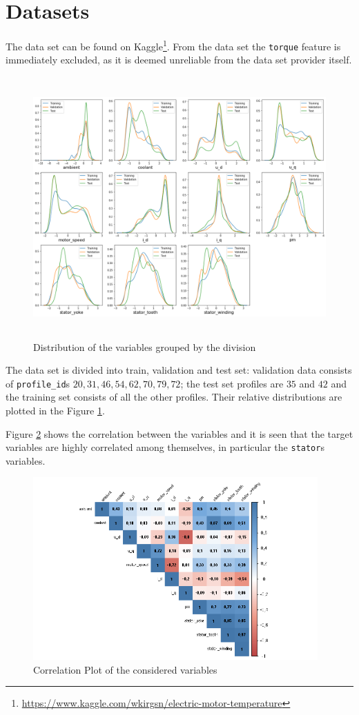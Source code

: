 \section{Datasets}
The data set can be found on Kaggle\footnote{\href{https://www.kaggle.com/wkirgsn/electric-motor-temperature}{https://www.kaggle.com/wkirgsn/electric-motor-temperature}}. From the data set the \verb|torque| feature is immediately excluded, as it is deemed unreliable from the data set provider itself.
\begin{figure}[!h]
    \centering
    \includegraphics[width=\linewidth, height=10cm]{imgs/dist_plot.png}
    \caption{Distribution of the variables grouped by the division}
    \label{fig:dist_plot}
\end{figure}

The data set is divided into train, validation and test set: validation data consists of \verb|profile_id|s $20, 31, 46, 54, 62, 70, 79, 72$; the test set profiles are $35$ and $42$ and the training set consists of all the other profiles. Their relative distributions are plotted in the Figure \ref{fig:dist_plot}.

Figure \ref{fig:corrplot} shows the correlation between the variables and it is seen that the target variables are highly correlated among themselves, in particular the \verb|stator|s variables.
\begin{figure}[!h]
    \centering
    \includegraphics[width=\linewidth, height=7cm]{imgs/corrplot.png}
    \caption{Correlation Plot of the considered variables}
    \label{fig:corrplot}
\end{figure}


